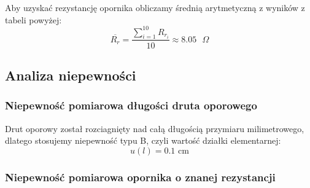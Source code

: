 \documentclass[a4paper,12pts]{article}
\begin{document}
\begin{table}[!h]
	\centering
	\caption{Wyniki pomiarów dla połączenia równoległego}
	\label{tabela:rownolegle}
\end{table}

Aby uzyskać rezystancję opornika obliczamy średnią arytmetyczną z wyników z tabeli powyżej:
\begin{equation}
\overline{R_{r}} = \frac{\sum_{i = 1}^{10} R_{{r}_i}}{10} \approx 8.05 \textrm{ $\Omega$}
\end{equation}


\subsection{Analiza niepewności}

\subsubsection{Niepewność pomiarowa długości druta oporowego}

Drut oporowy został rozciagnięty nad całą długością przymiaru milimetrowego, dlatego stosujemy niepewność typu B, czyli wartość działki elementarnej:
\begin{equation}
u(l) = 0.1 \textrm{ cm}
\end{equation}


\subsubsection{Niepewność pomiarowa opornika o znanej rezystancji}
\end{document}

